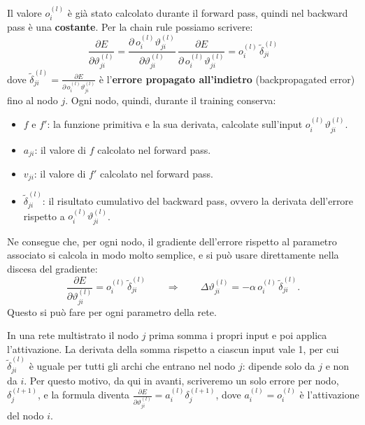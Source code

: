 Il valore $o_i^{(l)}$ è già stato calcolato durante il forward pass, quindi nel backward pass è una \textbf{costante}. Per la chain rule possiamo scrivere:
\[
\frac{\partial E}{\partial \vartheta_{ji}^{(l)}} = \frac{\partial\, o_i^{(l)}\vartheta_{ji}^{(l)}}{\partial \vartheta_{ji}^{(l)}}\,\frac{\partial E}{\partial\, o_i^{(l)}\vartheta_{ji}^{(l)}} = o_i^{(l)}\,\tilde{\delta}_{ji}^{(l)}
\]
dove $\tilde{\delta}_{ji}^{(l)} = \frac{\partial E}{\partial\, o_i^{(l)}\vartheta_{ji}^{(l)}}$ è l'\textbf{errore propagato all'indietro} (backpropagated error) fino al nodo $j$. Ogni nodo, quindi, durante il training conserva:
\begin{itemize}
    \item $f$ e $f'$: la funzione primitiva e la sua derivata, calcolate sull'input $o_i^{(l)}\vartheta_{ji}^{(l)}$.
    \item $a_{ji}$: il valore di $f$ calcolato nel forward pass.
    \item $v_{ji}$: il valore di $f'$ calcolato nel forward pass.
    \item $\tilde{\delta}_{ji}^{(l)}$: il risultato cumulativo del backward pass, ovvero la derivata dell'errore rispetto a $o_i^{(l)}\vartheta_{ji}^{(l)}$.
\end{itemize}
Ne consegue che, per ogni nodo, il gradiente dell'errore rispetto al parametro associato si calcola in modo molto semplice, e si può usare direttamente nella discesa del gradiente:
\[
\frac{\partial E}{\partial \vartheta_{ji}^{(l)}} = o_i^{(l)}\,\tilde{\delta}_{ji}^{(l)} \qquad \Longrightarrow \qquad \Delta\vartheta_{ji}^{(l)} = -\alpha\, o_i^{(l)}\,\tilde{\delta}_{ji}^{(l)}.
\]
Questo si può fare per ogni parametro della rete.

\begin{osservazione}
In una rete multistrato il nodo $j$ prima somma i propri input e poi applica l'attivazione. La derivata della somma rispetto a ciascun input vale 1, per cui $\tilde{\delta}_{ji}^{(l)}$ è uguale per tutti gli archi che entrano nel nodo $j$: dipende solo da $j$ e non da $i$. Per questo motivo, da qui in avanti, scriveremo un solo errore per nodo, $\delta_j^{(l+1)}$, e la formula diventa $\frac{\partial E}{\partial \vartheta_{ji}^{(l)}} = a_i^{(l)}\delta_j^{(l+1)}$, dove $a_i^{(l)} = o_i^{(l)}$ è l'attivazione del nodo $i$.
\end{osservazione}

